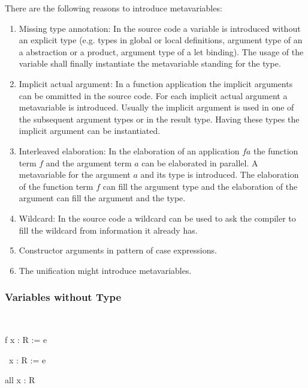 There are the following reasons to introduce metavariables:
\begin{enumerate}
    \item Missing type annotation: In the source code a variable is introduced
        without an explicit type (e.g. types in global or local definitions,
        argument type of an a abstraction or a product, argument type of a let
        binding). The usage of the variable shall finally instantiate the
        metavariable standing for the type.

    \item Implicit actual argument: In a function application the implicit
        arguments can be ommitted in the source code. For each implicit actual
        argument a metavariable is introduced. Usually the implicit argument is
        used in one of the subsequent argument types or in the result type.
        Having these types the implicit argument can be instantiated.

    \item Interleaved elaboration: In the elaboration of an application $f a$
        the function term $f$ and the argument term $a$ can be elaborated in
        parallel. A metavariable for the argument $a$ and its type is
        introduced. The elaboration of the function term $f$ can fill the
        argument type and the elaboration of the argument can fill the argument
        and the type.

    \item Wildcard: In the source code a wildcard can be used to ask the
        compiler to fill the wildcard from information it already has.

    \item Constructor arguments in pattern of case expressions.

    \item The unification might introduce metavariables.
\end{enumerate}





\subsubsection{Variables without Type}
\ \begin{alba}
    f x : R := e

    \ x : R := e

    all x : R
\end{alba}


